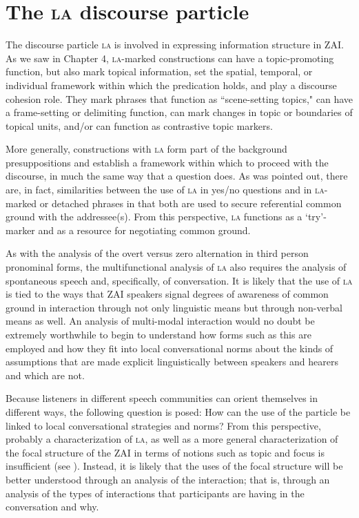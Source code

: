 \section{The \textsc{la} discourse particle}

The discourse particle \textsc{la} is involved in expressing information structure in ZAI. As we saw in Chapter 4, \textsc{la}-marked constructions can have a topic-promoting function, but also mark topical information, set the spatial, temporal, or individual framework within which the predication holds, and play a discourse cohesion role. They mark phrases that function as ``scene-setting topics," can have a frame-setting or delimiting function, can mark changes in topic or boundaries of topical units, and/or can function as contrastive topic markers.

More generally, constructions with \textsc{la} form part of the background presuppositions and establish a framework within which to proceed with the discourse, in much the same way that a question does. As was pointed out, there are, in fact, similarities between the use of \textsc{la} in yes/no questions and in \textsc{la}-marked or detached phrases in that both are used to secure referential common ground with the addressee(s). From this perspective, \textsc{la} functions as a `try'-marker and as a resource for negotiating common ground. 

As with the analysis of the overt versus zero alternation in third person pronominal forms, the multifunctional analysis of \textsc{la} also requires the analysis of spontaneous speech and, specifically, of conversation. It is likely that the use of \textsc{la} is tied to the ways that ZAI speakers signal degrees of awareness of common ground in interaction through not only linguistic means but through non-verbal means as well. An analysis of multi-modal interaction would no doubt be extremely worthwhile to begin to understand how forms such as this are employed and how they fit into local conversational norms about the kinds of assumptions that are made explicit linguistically between speakers and hearers and which are not. 

Because listeners in different speech communities can orient themselves in different ways, the following question is posed: How can the use of the particle be linked to local conversational strategies and norms? From this perspective, probably a characterization of \textsc{la}, as well as a more general characterization of the focal structure of the ZAI in terms of notions such as topic and focus is insufficient (see \citealt{matic2013,ozerov2015}). Instead, it is likely that the uses of the focal structure will be better understood through an analysis of the interaction; that is, through an analysis of the types of interactions that participants are having in the conversation and why.





